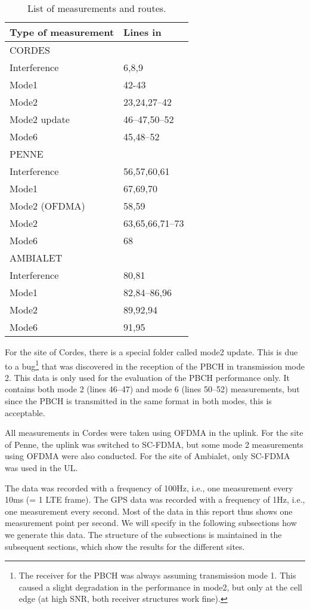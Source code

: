\documentclass[a4paper,10pt]{article}
\begin{document}
\begin{table}
\centering
\begin{tabular}{l|l}
\hline
Type of measurement & Lines in \cite{measurements_spreadsheet} \\ 
\hline
\hline
CORDES\\
\hline
Interference & 6,8,9 \\ 
Mode1 & 42-43 \\ 
Mode2 & 23,24,27--42\\
Mode2 update & 46--47,50--52\\ 
Mode6 & 45,48--52 \\ 
\hline
PENNE\\
\hline
Interference & 56,57,60,61 \\ 
Mode1 & 67,69,70 \\ 
Mode2 (OFDMA) &  58,59\\ 
Mode2 &  63,65,66,71--73\\ 
Mode6 &  68\\ 
\hline
AMBIALET\\
\hline
Interference &  80,81\\ 
Mode1 & 82,84--86,96\\ 
Mode2 &  89,92,94\\ 
Mode6 &  91,95\\ 

\end{tabular}
\caption{List of measurements and routes.}
\label{tab:meas_list}
\end{table}
 
For the site of Cordes, there is a special folder called mode2 update. This is due to a bug\footnote{The receiver for the PBCH was always assuming transmission mode 1. This caused a slight degradation in the performance in mode2, but only at the cell edge (at high SNR, both receiver structures work fine).} that was discovered in the reception of the PBCH in transmission mode 2. This data is only used for the evaluation of the PBCH performance only. It contains both mode 2 (lines 46--47) and mode 6 (lines 50--52) measurements, but since the PBCH is transmitted in the same format in both modes, this is acceptable. 

All measurements in Cordes were taken using OFDMA in the uplink. For the site of Penne, the uplink was switched to SC-FDMA, but some mode 2 measurements using OFDMA were also conducted. For the site of Ambialet, only SC-FDMA was used in the UL.

The data was recorded with a frequency of 100Hz, i.e., one measurement every 10ms (= 1 LTE frame). The GPS data was recorded with a frequency of 1Hz, i.e., one measurement every second. Most of the data in this report thus shows one measurement point per second. We will specify in the following subsections how we generate this data. The structure of the subsections is maintained in the subsequent sections, which show the results for the different sites. 
\end{document}
